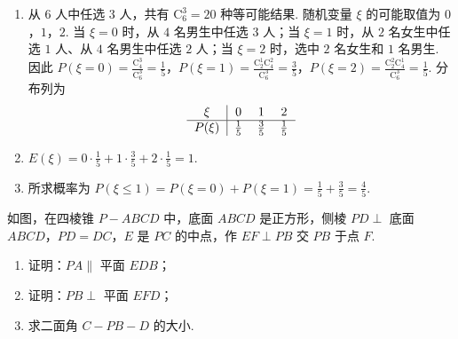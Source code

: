 \begin{solution}
\begin{enumerate}
\item 从 \(6\) 人中任选 \(3\) 人，共有 \(\mathrm C_6^3=20\) 种等可能结果. 随机变量 \(\xi\) 的可能取值为 \(0\)，\(1\)，\(2\). 当 \(\xi=0\) 时，从 \(4\) 名男生中任选 \(3\) 人；当 \(\xi=1\) 时，从 \(2\) 名女生中任选 \(1\) 人、从 \(4\) 名男生中任选 \(2\) 人；当 \(\xi=2\) 时，选中 \(2\) 名女生和 \(1\) 名男生. 因此 \(P(\xi=0)=\frac{\mathrm C_4^3}{\mathrm C_6^3}=\frac15\)，\(P(\xi=1)=\frac{\mathrm C_2^1\mathrm C_4^2}{\mathrm C_6^3}=\frac35\)，\(P(\xi=2)=\frac{\mathrm C_2^2\mathrm C_4^1}{\mathrm C_6^3}=\frac15\). 分布列为
\[
\begin{tabular}{c|ccc}
\(\xi\) & \(0\) & \(1\) & \(2\) \\
\hline
\(P(\xi)\) & \(\frac15\) & \(\frac35\) & \(\frac15\)
\end{tabular}
\]

\item \(E(\xi)=0\cdot\frac15+1\cdot\frac35+2\cdot\frac15=1\).

\item 所求概率为 \(P(\xi\leqslant1)=P(\xi=0)+P(\xi=1)=\frac15+\frac35=\frac45\).
\end{enumerate}
\end{solution}

\begin{problem}
如图，在四棱锥 \(P - ABCD\) 中，底面 \(ABCD\) 是正方形，侧棱 \(PD \perp\) 底面 \(ABCD\)，\(PD = DC\)，\(E\) 是 \(PC\) 的中点，作 \(EF \perp PB\) 交 \(PB\) 于点 \(F\).

\begin{enumerate}
\item 证明：\(PA \parallel\) 平面 \(EDB\)；
\item 证明：\(PB \perp\) 平面 \(EFD\)；
\item 求二面角 \(C - PB - D\) 的大小.
\end{enumerate}

\begin{center}
\end{center}
\end{problem}

